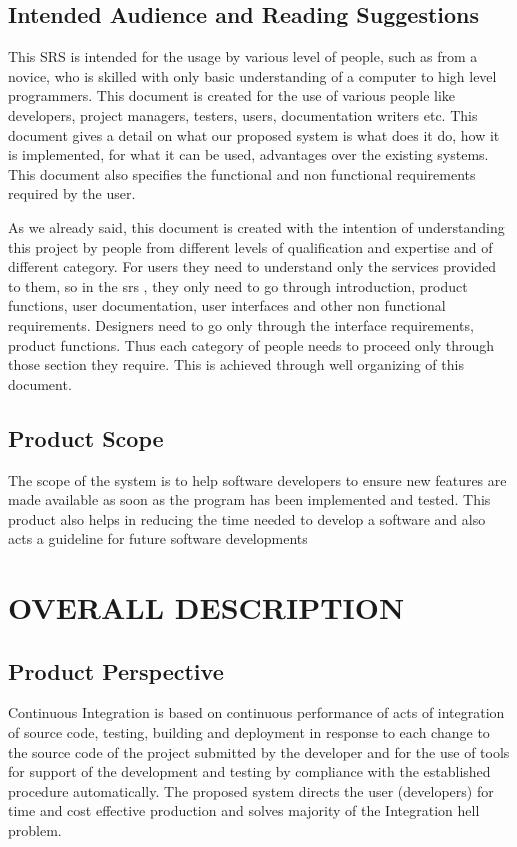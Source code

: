 \documentclass[12pt,a4paper,oneside]{report}
\begin{document}
\section{Intended Audience and Reading Suggestions}
\par
This SRS is intended for the usage by various level of people, such as from a novice, who is skilled with only basic understanding of a computer to high level programmers. This document is created for the use of various people like developers, project managers, testers, users, documentation writers etc. This document gives a detail on what our proposed system is what does it do, how it is implemented, for what it can be used, advantages over the existing systems. This document also specifies the functional and non functional requirements required by the user.
\par As we already said, this document is created with the intention of understanding this project by people from different levels of qualification and expertise and of different category. For users they need to understand only the services provided to them, so in the srs , they only need to go through introduction, product functions, user documentation, user interfaces and other non functional requirements. Designers need to go only through the interface requirements, product functions. Thus each category of people needs to proceed only through those section they require. This is achieved through well organizing of this document. 
\section{Product Scope }
The scope of the system is to help software developers to ensure new features are made available as soon as the program has been
implemented and tested. This product also helps in reducing the time needed to develop a software and also acts a guideline for future software developments




\chapter{OVERALL DESCRIPTION}
\section{Product Perspective}
\par
Continuous Integration is based on continuous performance of acts of integration of source code, testing, building and deployment in response to each change to the source code of the project submitted by the developer and for the use of tools for support of the development and testing by compliance with the established procedure automatically. The proposed system directs the user (developers) for time and cost effective production and solves majority of the Integration hell problem.
\end{document}

